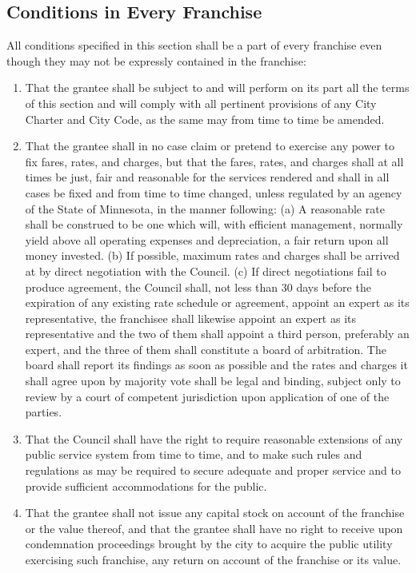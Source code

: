 \subsection{Conditions in Every Franchise}
All conditions specified in this section shall be a part of every franchise even though they may not be expressly contained in the franchise:
\begin{enumerate}
\item That the grantee shall be subject to and will perform on its part all the terms of this section and will comply with all pertinent provisions of any City Charter and City Code, as the same may from time to time be amended.
\item That the grantee shall in no case claim or pretend to exercise any power to fix fares, rates, and charges, but that the fares, rates, and charges shall at all times be just, fair and reasonable for the services rendered and shall in all cases be fixed and from time to time changed, unless regulated by an agency of the State of Minnesota, in the manner following:
\newline\indent(a) A reasonable rate shall be construed to be one which will, with efficient management, normally yield above all operating expenses and depreciation, a fair return upon all money invested.
\newline\indent(b) If possible, maximum rates and charges shall be arrived at by direct negotiation with the Council.
\newline\indent(c) If direct negotiations fail to produce agreement, the Council shall, not less than 30 days before the expiration of any existing rate schedule or agreement, appoint an expert as its representative, the franchisee shall likewise appoint an expert as its representative and the two of them shall appoint a third person, preferably an expert, and the three of them shall constitute a board of arbitration. The board shall report its findings as soon as possible and the rates and charges it shall agree upon by majority vote shall be legal and binding, subject only to review by a court of competent jurisdiction upon application of one of the parties.
\item That the Council shall have the right to require reasonable extensions of any public service system from time to time, and to make such rules and regulations as may be required to secure adequate and proper service and to provide sufficient accommodations for the public.
\item That the grantee shall not issue any capital stock on account of the franchise or the value thereof, and that the grantee shall have no right to receive upon condemnation proceedings brought by the city to acquire the public utility exercising such franchise, any return on account of the franchise or its value.

\end{enumerate}
